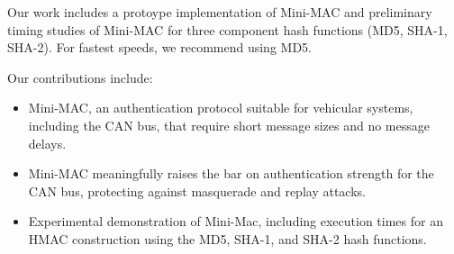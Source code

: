 Our work includes a protoype implementation of Mini-MAC and preliminary timing studies 
of Mini-MAC for three component hash functions (MD5, SHA-1, SHA-2).  For fastest speeds, 
we recommend using MD5.

Our contributions include:
\begin{itemize}

\item Mini-MAC, an authentication protocol suitable for vehicular systems, including the CAN bus, 
that require short message sizes and no message delays.

\item Mini-MAC meaningfully raises the bar on authentication strength for the CAN bus, protecting against
masquerade and replay attacks.

\item Experimental demonstration of Mini-Mac, including execution times for an HMAC
construction using the MD5, SHA-1, and SHA-2 hash functions.

\end{itemize}